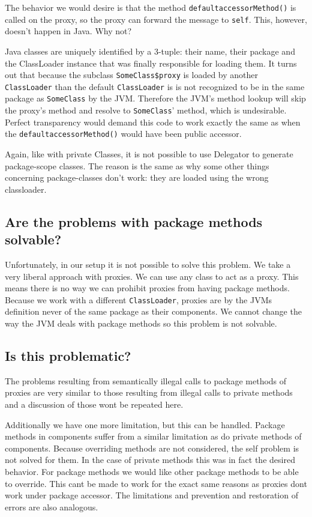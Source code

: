 \documentclass[a4paper,12pt]{book}
\begin{document}
The behavior we would desire is that the method \verb|defaultaccessorMethod()| is called on the proxy, so the proxy can forward the message to \verb|self|. This, however, doesn't happen in Java. Why not? 

Java classes are uniquely identified by a 3-tuple: their name, their package and the ClassLoader instance that was finally responsible for loading them. It turns out that because the subclass \verb|SomeClass$proxy| is loaded by another \verb|ClassLoader| than the default \verb|ClassLoader| is is not recognized to be in the same package as \verb|SomeClass| by the JVM. Therefore the JVM's method lookup will skip the proxy's method and resolve to \verb|SomeClass|' method, which is undesirable. Perfect transparency would demand this code to work exactly the same as when the \verb|defaultaccessorMethod()| would have been public accessor.

Again, like with private Classes, it is not possible to use Delegator to generate package-scope classes. The reason is the same as why some other things concerning package-classes don't work: they are loaded using the wrong classloader.

\subsection*{Are the problems with package methods solvable?}
Unfortunately, in our setup it is not possible to solve this problem. We take a very liberal approach with proxies. We can use any class to act as a proxy. This means there is no way we can prohibit proxies from having package methods. Because we work with a different \verb|ClassLoader|, proxies are by the JVMs definition never of the same package as their components. We cannot change the way the JVM deals with package methods so this problem is not solvable.

\subsection*{Is this problematic?}
The problems resulting from semantically illegal calls to package methods of proxies are very similar to those resulting from illegal calls to private methods and a discussion of those wont be repeated here.

Additionally we have one more limitation, but this can be handled. Package methods in components suffer from a similar limitation as do private methods of components. Because overriding methods are not considered, the self problem is not solved for them. In the case of private methods this was in fact the desired behavior. For package methods we would like other package methods to be able to override. This cant be made to work for the exact same reasons as proxies dont work under package accessor. The limitations and prevention and restoration of errors are also analogous.
\end{document}
